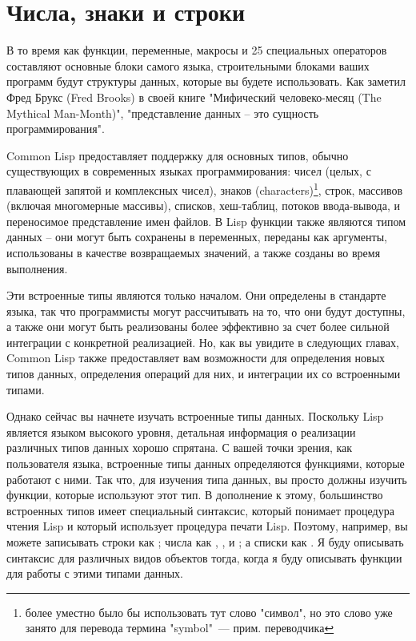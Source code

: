 \chapter{Числа, знаки и строки}
\label{ch:10}

В то время как функции, переменные, макросы и 25 специальных операторов составляют
основные блоки самого языка, строительными блоками ваших программ будут структуры данных,
которые вы будете использовать.  Как заметил Фред Брукс (Fred Brooks) в своей книге
"Мифический человеко-месяц (The Mythical Man-Month)", "представление данных -- это
сущность программирования".

Common Lisp предоставляет поддержку для основных типов, обычно существующих в современных
языках программирования: чисел (целых, с плавающей запятой и комплексных чисел), знаков
(characters)\footnote{более уместно было бы использовать тут слово "символ", но это слово
  уже занято для перевода термина "symbol"~--- прим. переводчика }, строк, массивов
(включая многомерные массивы), списков, хеш-таблиц, потоков ввода-вывода, и переносимое
представление имен файлов.  В Lisp функции также являются типом данных -- они могут быть
сохранены в переменных, переданы как аргументы, использованы в качестве возвращаемых
значений, а также созданы во время выполнения.

Эти встроенные типы являются только началом.  Они определены в стандарте языка, так что
программисты могут рассчитывать на то, что они будут доступны, а также они могут быть
реализованы более эффективно за счет более сильной интеграции с конкретной реализацией.
Но, как вы увидите в следующих главах, Common Lisp также предоставляет вам возможности для
определения новых типов данных, определения операций для них, и интеграции их со
встроенными типами.

Однако сейчас вы начнете изучать встроенные типы данных.  Поскольку Lisp является языком
высокого уровня, детальная информация о реализации различных типов данных хорошо спрятана.
С вашей точки зрения, как пользователя языка, встроенные типы данных определяются
функциями, которые работают с ними.  Так что, для изучения типа данных, вы просто должны
изучить функции, которые используют этот тип.  В дополнение к этому, большинство
встроенных типов имеет специальный синтаксис, который понимает процедура чтения Lisp и
который использует процедура печати Lisp.  Поэтому, например, вы можете записывать строки
как ; числа как , , и ; а списки как .  Я буду описывать синтаксис для различных видов объектов тогда, когда я буду
описывать функции для работы с этими типами данных.

